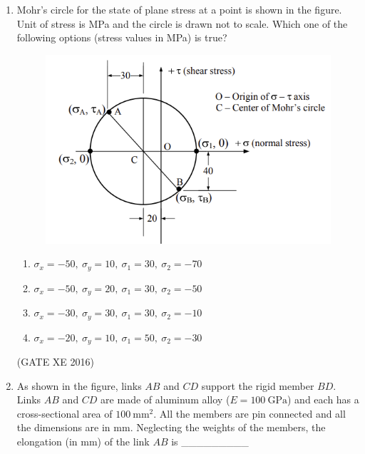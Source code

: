 \documentclass[12pt]{article}
\begin{document}
\begin{enumerate}
\begin{multicols}{2}
\begin{enumerate}
\item $-0.0020, \ 0.0025 \ \text{and} \ 0.0020$
\item $0.0020, \ -0.0025 \ \text{and} \ -0.0020$
\item $0.0025, \ -0.0020 \ \text{and} \ 0.0020$
\item $-0.0020, \ 0.0025 \ \text{and} \ -0.0020$
\end{enumerate}
\end{multicols}

(GATE XE 2016)

\item Mohr’s circle for the state of plane stress at a point is shown in the figure. Unit of stress is MPa and the circle is drawn not to scale. Which one of the following options (stress values in MPa) is true?

\begin{figure}[H]
    \centering
    \includegraphics[width=0.5\columnwidth]{figs/ass3_d_q15.png}
    \caption{}
    \label{fig:placeholder}
\end{figure}

\begin{multicols}{2}
\begin{enumerate}
\item $\sigma_x = -50, \ \sigma_y = 10, \ \sigma_1 = 30, \ \sigma_2 = -70$
\item $\sigma_x = -50, \ \sigma_y = 20, \ \sigma_1 = 30, \ \sigma_2 = -50$
\item $\sigma_x = -30, \ \sigma_y = 30, \ \sigma_1 = 30, \ \sigma_2 = -10$
\item $\sigma_x = -20, \ \sigma_y = 10, \ \sigma_1 = 50, \ \sigma_2 = -30$
\end{enumerate}
\end{multicols}

(GATE XE 2016)

\item As shown in the figure, links $AB$ and $CD$ support the rigid member $BD$. Links $AB$ and $CD$ are made of aluminum alloy ($E = 100 \ \text{GPa}$) and each has a cross-sectional area of $100 \ \text{mm}^2$. All the members are pin connected and all the dimensions are in mm. Neglecting the weights of the members, the elongation (in mm) of the link $AB$ is \_\_\_\_\_\_\_\_\_


\end{enumerate}
\end{document}
